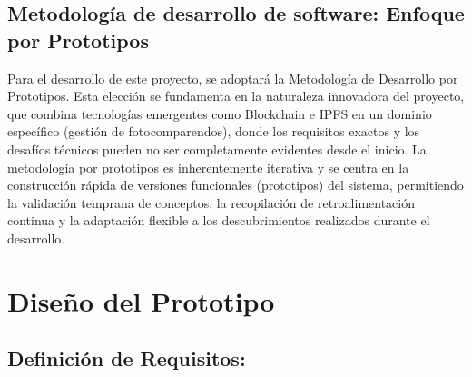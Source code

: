 \documentclass[
    letterpaper, 
    man,   
    spanish,
    12pt,
    donotrepeattitle,
    floatsintext,
    hidelinks %
]{apa7}
\begin{document}
   \subsection{Metodología de desarrollo de software: Enfoque por Prototipos }
Para el desarrollo de este proyecto, se adoptará la Metodología de Desarrollo por Prototipos. Esta elección se fundamenta en la naturaleza innovadora del proyecto, que combina tecnologías emergentes como Blockchain e IPFS en un dominio específico (gestión de fotocomparendos), donde los requisitos exactos y los desafíos técnicos pueden no ser completamente evidentes desde el inicio. La metodología por prototipos es inherentemente iterativa y se centra en la construcción rápida de versiones funcionales (prototipos) del sistema, permitiendo la validación temprana de conceptos, la recopilación de retroalimentación continua y la adaptación flexible a los descubrimientos realizados durante el desarrollo. 

\section{Diseño del Prototipo }
    \subsection{Definición de Requisitos:  }
    
\end{document}
